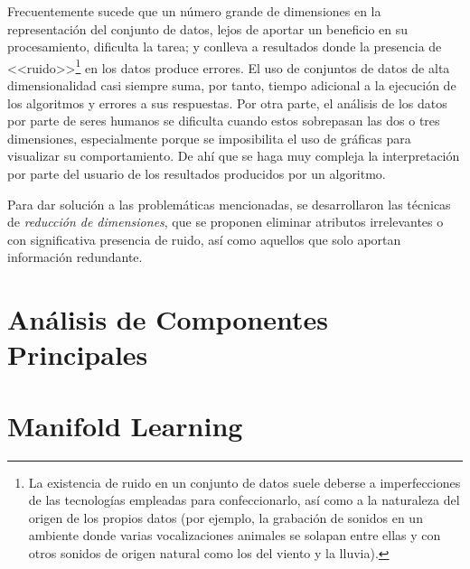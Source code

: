 Frecuentemente sucede que un número grande de dimensiones en la representación del conjunto de datos, lejos de aportar un beneficio en su procesamiento, dificulta la tarea; y conlleva a resultados donde la presencia de <<ruido>>\footnote{La existencia de ruido en un conjunto de datos suele deberse a imperfecciones de las tecnologías empleadas para confeccionarlo, así como a la naturaleza del origen de los propios datos (por ejemplo, la grabación de sonidos en un ambiente donde varias vocalizaciones animales se solapan entre ellas y con otros sonidos de origen natural como los del viento y la lluvia).} en los datos produce errores.
El uso de conjuntos de datos de alta dimensionalidad casi siempre suma, por tanto, tiempo adicional a la ejecución de los algoritmos y errores a sus respuestas.
Por otra parte, el análisis de los datos por parte de seres humanos se dificulta cuando estos sobrepasan las dos o tres dimensiones, especialmente porque se imposibilita el uso de gráficas para visualizar su comportamiento.
De ahí que se haga muy compleja la interpretación por parte del usuario de los resultados producidos por un algoritmo.

Para dar solución a las problemáticas mencionadas, se desarrollaron las técnicas de \textit{reducción de dimensiones}, que se proponen eliminar atributos irrelevantes o con significativa presencia de ruido, así como aquellos que solo aportan información redundante.

\section{Análisis de Componentes Principales}\label{sec:PCA}


\section{Manifold Learning}\label{sec:manifoldLearning}


